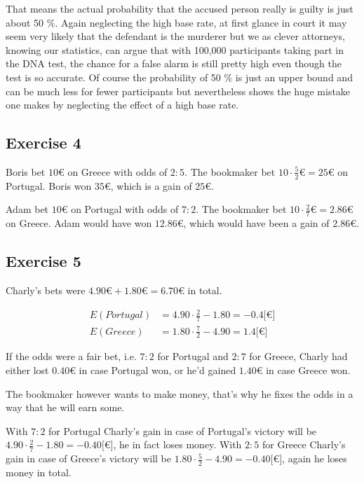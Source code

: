 That means the actual probability that the accused person really is guilty is just about 50 \%. Again neglecting the high base rate, at first glance in court  it may seem very likely that the defendant is the murderer but we as clever attorneys, knowing our statistics, can argue that with 100,000 participants taking part in the DNA test, the chance for a false alarm is still pretty high even though the test is so accurate. Of course the probability of 50 \% is just an upper bound and can be much less for fewer participants but nevertheless shows the huge mistake one makes by neglecting the effect of a high base rate.  

\subsection*{Exercise 4}
Boris bet $10\euro$ on Greece with odds of $2 : 5$. The bookmaker bet $10\cdot\frac{5}{2}\euro=25\euro$ on Portugal. Boris won $35\euro$, which is a gain of $25\euro$.

Adam bet $10\euro$ on Portugal with odds of $7 : 2$. The bookmaker bet $10\cdot\frac{2}{7}\euro=2.86\euro$ on Greece. Adam would have won $12.86\euro$, which would have been a gain of $2.86\euro$.

\subsection*{Exercise 5}
Charly's bets were $4.90\euro+1.80\euro=6.70\euro$ in total.

\begin{align*}
E(Portugal) &= 4.90 \cdot \frac{2}{7} - 1.80 = -0.4 {[}\euro{]} \\
E(Greece)   &= 1.80 \cdot \frac{7}{2} - 4.90 =  1.4 {[}\euro{]}
\end{align*}

If the odds were a fair bet, i.e. $7 : 2$ for Portugal and $2 : 7$ for Greece, Charly had either lost $0.40\euro$ in case Portugal won, or he'd gained $1.40\euro$ in case Greece won.

The bookmaker however wants to make money, that's why he fixes the odds in a way that he will earn some.

With $7 : 2$ for Portugal Charly's gain in case of Portugal's victory will be $4.90 \cdot \frac{2}{7} - 1.80 = -0.40 {[}\euro{]}$, he in fact loses money.
With $2 : 5$ for Greece Charly's gain in case of Greece's victory will be $1.80 \cdot \frac{5}{2} - 4.90 = -0.40 {[}\euro{]}$, again he loses money in total.

